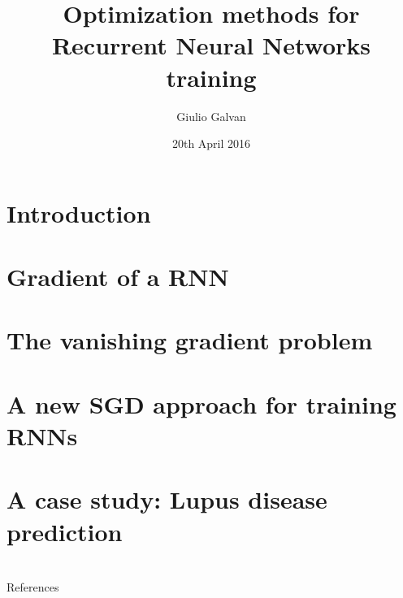 \documentclass[xcolor=dvipsnames,10pt]{beamer}
\title{Optimization methods for Recurrent Neural Networks training}
\date{20th April 2016}
\author{Giulio Galvan}
\institute{Università degli studi di Firenze}
\def\maketitle{\frame{\titlepage}}
\begin{document}
\addtocounter{framenumber}{-1}
\begin{frame}[plain] \titlepage \end{frame}
\section{Introduction}

\section{Gradient of a RNN}

\section{The vanishing gradient problem}

%
\section{A new SGD approach for training RNNs}

\section{A case study: Lupus disease prediction}


\section{}
\begin{frame}[allowframebreaks]{References}
	\nocite{*}
	
	
\end{frame}
\end{document}
